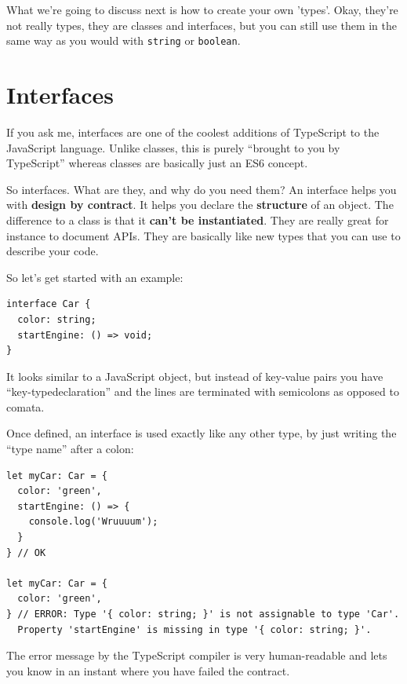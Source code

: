 \documentclass[12pt,a4paper]{report}
\begin{document}
What we're going to discuss next is how to create your own 'types'. Okay, they're not really types, they are classes and interfaces, but you can still use them in the same way as you would with \texttt{string} or \texttt{boolean}.

\section{Interfaces}
If you ask me, interfaces are one of the coolest additions of TypeScript to the JavaScript language. Unlike classes, this is purely ``brought to you by TypeScript'' whereas classes are basically just an ES6 concept.

So interfaces. What are they, and why do you need them? An interface helps you with \textbf{design by contract}. It helps you declare the \textbf{structure} of an object. The difference to a class is that it \textbf{can't be instantiated}. They are really great for instance to document APIs. They are basically like new types that you can use to describe your code.

So let's get started with an example:
\begin{lstlisting}
interface Car {
  color: string;
  startEngine: () => void;
}
\end{lstlisting}
It looks similar to a JavaScript object, but instead of key-value pairs you have ``key-typedeclaration'' and the lines are terminated with semicolons as opposed to comata.

Once defined, an interface is used exactly like any other type, by just writing the ``type name'' after a colon:
\begin{lstlisting}
let myCar: Car = {
  color: 'green',
  startEngine: () => {
    console.log('Wruuuum');
  }
} // OK

let myCar: Car = {
  color: 'green',
} // ERROR: Type '{ color: string; }' is not assignable to type 'Car'.
  Property 'startEngine' is missing in type '{ color: string; }'.
\end{lstlisting}
The error message by the TypeScript compiler is very human-readable and lets you know in an instant where you have failed the contract.
\end{document}

